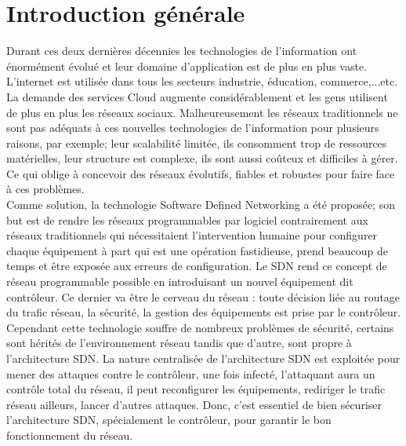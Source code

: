 
\chapter{Introduction générale} 

\label{Introduction} 
Durant ces deux dernières décennies les technologies de l’information ont  énormément évolué et leur domaine d’application est de plus en plus vaste. L’internet est utilisée dans tous les secteurs industrie, éducation, commerce,...etc. La demande des services Cloud augmente considérablement et les gens utilisent de plus en plus les réseaux sociaux. Malheureusement les réseaux traditionnels ne sont pas adéquats à ces nouvelles technologies de l’information  pour plusieurs raisons, par exemple; leur scalabilité limitée, ils consomment trop de ressources matérielles,  leur structure est complexe, ils sont aussi coûteux et difficiles à gérer.  Ce qui oblige à concevoir des réseaux évolutifs, fiables et robustes pour faire face à ces problèmes.\\

	Comme solution, la technologie Software Defined Networking a été proposée; son but est de rendre les réseaux programmables par logiciel contrairement aux réseaux traditionnels qui nécessitaient l’intervention humaine  pour configurer chaque équipement à part qui est une opération fastidieuse, prend beaucoup de temps et être exposée aux erreurs de configuration. Le SDN rend ce concept de réseau programmable possible en introduisant un nouvel équipement dit contrôleur. Ce dernier va être le cerveau du réseau : toute décision liée au routage du trafic réseau, la sécurité, la gestion des équipements est prise par le contrôleur.\\
	
	Cependant cette technologie souffre de nombreux problèmes de sécurité, certains sont hérités de l’environnement réseau tandis que d’autre, sont propre à l’architecture SDN. La nature centralisée de l’architecture SDN est exploitée pour mener des attaques contre le contrôleur, une fois infecté, l’attaquant aura un contrôle total du réseau, il peut reconfigurer les équipements, rediriger le trafic réseau ailleurs, lancer d’autres attaques. Donc, c'est essentiel de bien sécuriser l'architecture SDN, spécialement le contrôleur, pour garantir le bon fonctionnement du réseau.\\
	
